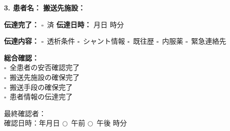 \documentclass[a4paper,12pt]{jarticle}
\newcommand{\checkbox}{$\square$\ }
\newcommand{\underlinespace}[1]{\underline{\hspace{#1}}}
\newcommand{\circlecheck}{$\bigcirc$\ }
\begin{document}
\vspace{4mm}

\textbf{3. 患者名：} \underlinespace{4cm} \quad \textbf{搬送先施設：} \underlinespace{4cm}

\quad \textbf{伝達完了：} \checkbox 済 \quad \textbf{伝達日時：} \underlinespace{1cm}月\underlinespace{1cm}日 \underlinespace{1cm}時\underlinespace{1cm}分

\quad \textbf{伝達内容：} \checkbox 透析条件 \checkbox シャント情報 \checkbox 既往歴 \checkbox 内服薬 \checkbox 緊急連絡先


\vspace{10mm}

\noindent
\textbf{総合確認：} \\
\checkbox 全患者の安否確認完了 \\
\checkbox 搬送先施設の確保完了 \\
\checkbox 搬送手段の確保完了 \\
\checkbox 患者情報の伝達完了

\vspace{5mm}

\noindent
最終確認者：\underlinespace{4cm} \\
\vspace{3mm}
確認日時：\underlinespace{2cm}年\underlinespace{1cm}月\underlinespace{1cm}日 \quad \circlecheck 午前 \quad \circlecheck 午後 \quad \underlinespace{1cm}時\underlinespace{1cm}分
\end{document}
